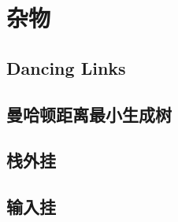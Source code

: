 \section{杂物}

\subsection{Dancing Links}

\subsection{曼哈顿距离最小生成树}

\subsection{栈外挂}

\subsection{输入挂}

